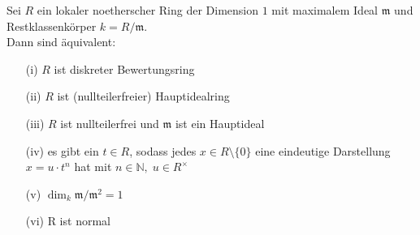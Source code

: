 \begin{Satz} 
\label{Satz12}
Sei $R$ ein lokaler noetherscher Ring der Dimension $1$ mit maximalem Ideal
$\mathfrak{m}$ und Restklassenkörper $k = R/\mathfrak{m}$.\\
Dann sind äquivalent:
\begin{enumerate}
  \item[(i)] $R$ ist diskreter Bewertungsring
  \item[(ii)] $R$ ist (nullteilerfreier) Hauptidealring
  \item[(iii)] $R$ ist nullteilerfrei und $\mathfrak{m}$ ist ein Hauptideal
  \item[(iv)] es gibt ein $t \in R$, sodass jedes $x \in R \setminus \{0\}$ eine
  eindeutige Darstellung $x=u \cdot t^n$ hat mit $n \in \mathbb{N}, \; u \in
  R^{\times}$
  \item[(v)] $\dim_k \mathfrak{m}/\mathfrak{m}^2 = 1$
  \item[(vi)] R ist normal
\end{enumerate}
\end{Satz}

